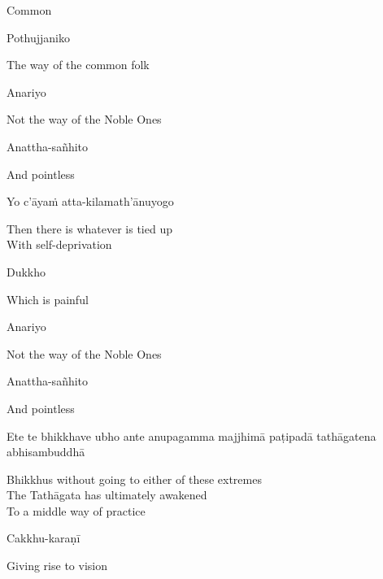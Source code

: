 \begin{english}
  Common
\end{english}

Pothujjaniko

\begin{english}
  The way of the common folk
\end{english}

Anariyo

\begin{english}
  Not the way of the Noble Ones
\end{english}

Anattha-sañhito

\begin{english}
  And pointless
\end{english}

Yo c'āyaṁ atta-kilamath'ānuyogo

\begin{english}
  Then there is whatever is tied up\\
  With self-deprivation
\end{english}

Dukkho

\begin{english}
  Which is painful
\end{english}

Anariyo

\begin{english}
  Not the way of the Noble Ones
\end{english}

Anattha-sañhito

\begin{english}
  And pointless
\end{english}

\begin{pali-hang}
  Ete te bhikkhave ubho ante anupagamma majjhimā paṭipadā tathāgatena abhisambuddhā
\end{pali-hang}

\begin{english-verses}
  Bhikkhus without going to either of these extremes\\
  The Tathāgata has ultimately awakened\\
  To a middle way of practice
\end{english-verses}

Cakkhu-karaṇī

\begin{english}
  Giving rise to vision
\end{english}

